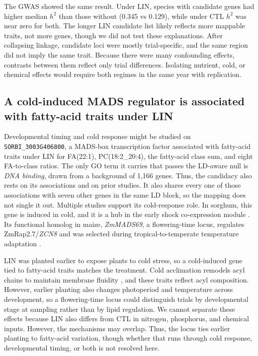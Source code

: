 \documentclass[9pt,twocolumn,twoside]{rilabRxiv}
\begin{document}
The GWAS showed the same result. Under LIN, species with candidate genes had higher median $h^2$ than those without (0.345 vs 0.129), while under CTL $h^2$ was near zero for both. The longer LIN candidate list likely reflects more mappable traits, not more genes, though we did not test these explanations. After collapsing linkage, candidate loci were mostly trial-specific, and the same region did not imply the same trait. Because there were many confounding effects, contrasts between them reflect only trial differences. Isolating nutrient, cold, or chemical effects would require both regimes in the same year with replication.

\subsection*{A cold-induced MADS regulator is associated with fatty-acid traits under LIN}

Developmental timing and cold response might be studied on \texttt{SORBI\_3003G406800}, a MADS-box transcription factor associated with fatty-acid traits under LIN for FA(22:1), PC(18:2\_20:4), the fatty-acid class sum, and eight FA-to-class ratios. The only GO term it carries that passes the LD-aware null is \textit{DNA binding}, drawn from a background of 1,166 genes. Thus, the candidacy also rests on its associations and on prior studies. It also shares every one of those associations with seven other genes in the same LD block, so the mapping does not single it out. Multiple studies support its cold-response role. In sorghum, this gene is induced in cold, and it is a hub in the early shock co-expression module \citep{Kurt2026ColdSorghum}. Its functional homolog in maize, \textit{ZmMADS69}, a flowering-time locus, regulates ZmRap2.7/\textit{ZCN8} and was selected during tropical-to-temperate temperature adaptation \citep{Liang2019ZmMADS69}.

LIN was planted earlier to expose plants to cold stress, so a cold-induced gene tied to fatty-acid traits matches the treatment. Cold acclimation remodels acyl chains to maintain membrane fluidity \citep{Tan2018, Zhang2020}, and these traits reflect acyl composition. However, earlier planting also changes photoperiod and temperature across development, so a flowering-time locus could distinguish trials by developmental stage at sampling rather than by lipid regulation. We cannot separate these effects because LIN also differs from CTL in nitrogen, phosphorus, and chemical inputs. However, the mechanisms may overlap. Thus, the locus ties earlier planting to fatty-acid variation, though whether that runs through cold response, developmental timing, or both is not resolved here.
\end{document}

